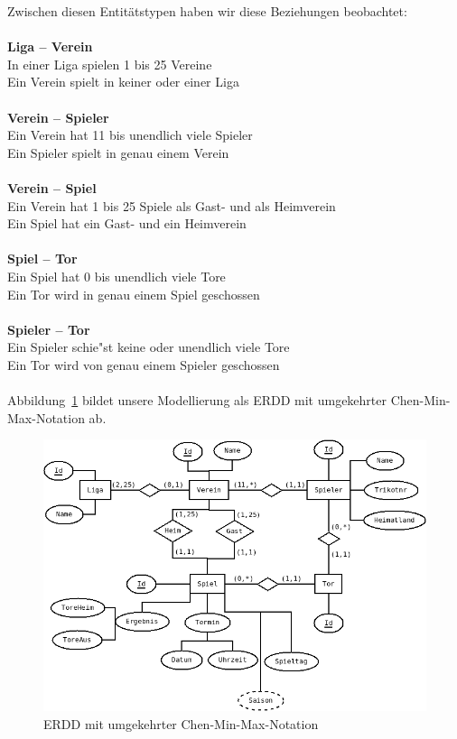 \documentclass[
10pt,
a4paper
]{scrartcl}
\begin{document}
Zwischen diesen Entitätstypen haben wir diese Beziehungen beobachtet:\\
\\
\textbf{Liga – Verein}\\
In einer Liga spielen 1 bis 25 Vereine\\
Ein Verein spielt in keiner oder einer Liga\\
\\
\textbf{Verein – Spieler}\\
Ein Verein hat 11 bis unendlich viele Spieler\\
Ein Spieler spielt in genau einem Verein\\
\\
\textbf{Verein – Spiel}\\
Ein Verein hat 1 bis 25 Spiele als Gast- und als Heimverein\\
Ein Spiel hat ein Gast- und ein Heimverein\\
\\
\textbf{Spiel – Tor}\\
Ein Spiel hat 0 bis unendlich viele Tore\\
Ein Tor wird in genau einem Spiel geschossen \\
\\
\textbf{Spieler – Tor}\\
Ein Spieler schie"st keine oder unendlich viele Tore\\
Ein Tor wird von genau einem Spieler geschossen \\ 
\\

Abbildung~\ref{fig:buli_iter1} bildet unsere Modellierung als ERDD mit umgekehrter Chen-Min-Max-Notation ab.

\begin{figure}[H]
	\centering
  \includegraphics[scale=0.5]{bundesliga_iter1.png}
	\caption{ERDD mit umgekehrter Chen-Min-Max-Notation}
	\label{fig:buli_iter1}
\end{figure}
\end{document}
